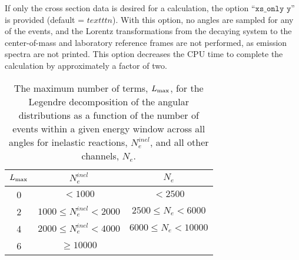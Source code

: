 \documentclass[
10pt,
showpacs,preprintnumbers,footinbib,
amsfonts,amsmath,amssymb,
aps,
prc,twocolumn,groupedaddress,superscriptaddress,
showkeys,
nofootinbib
]{revtex4-1}
\begin{document}
If only the cross section data is desired for a calculation, the option ``${\texttt{xs\_only y}}$'' is provided (default = ${texttt{n}}$). With this option, no angles are sampled for any of the events, and the Lorentz transformations from the decaying system to the center-of-mass and laboratory reference frames are not performed, as emission spectra are not printed. This option decreases the CPU time to complete the calculation by approximately a factor of two.

\begin{table}
\caption{The maximum number of terms, $L_{\rm max}$, for the Legendre decomposition of the angular distributions as a function of the number of events within a given energy window across all angles for inelastic reactions, $N_e^{inel}$, and all other channels, $N_e$.}
\begin{center}
\begin{tabular}{| c | c | c |}
\hline
$L_{\rm max}$ & $N_e^{inel}$ & $N_e$ \\
\hline
0 & $< 1000$ & $< 2500$\\
2 & $1000 \le N_e^{inel} < 2000$ & $2500 \le N_e < 6000$\\
4 & $2000 \le N_e^{inel} < 4000$ & $6000 \le N_e < 10000$\\
6 & $\ge 10000$\\
\hline
\end{tabular}
\label{tab:L_max}
\end{center}
\end{table}
\end{document}
